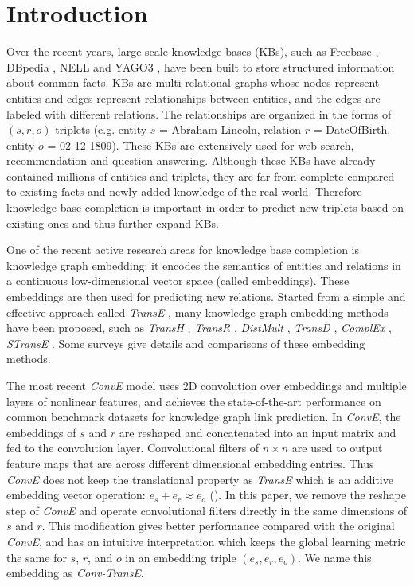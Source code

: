 \documentclass[letterpaper]{article} \usepackage{aaai19}  \usepackage{times}  \usepackage{helvet}  \usepackage{courier}  \usepackage{url}  \usepackage{graphicx}  \usepackage{amsmath}
\begin{document}
\section{Introduction}
\noindent

Over the recent years, large-scale knowledge bases (KBs), such as Freebase \cite{bollacker2008freebase}, DBpedia \cite{auer2007dbpedia}, NELL \cite{carlson2010toward} and YAGO3 \cite{mahdisoltani2013yago3}, have been built to store structured information about common facts. KBs are multi-relational graphs whose nodes represent entities and edges represent relationships between entities, and the edges are labeled with different relations. The relationships are organized in the forms of $(s,r,o)$ triplets (e.g. entity $s$ = Abraham Lincoln, relation $r$ = DateOfBirth, entity $o$ = 02-12-1809). These KBs are extensively used for web search, recommendation and question answering. Although these KBs have already contained millions of entities and triplets, they are far from complete compared to existing facts and newly added knowledge of the real world. Therefore knowledge base completion is important in order to predict new triplets based on existing ones and thus further expand KBs.

One of the recent active research areas for knowledge base completion is knowledge graph embedding: it encodes the semantics of entities and relations in a continuous low-dimensional vector space (called embeddings). These embeddings are then used for predicting new relations. Started from a simple and effective approach called
{\it TransE} \cite{bordes2013translating}, many knowledge graph embedding methods have been proposed, such as {\it TransH} \cite{wang2014knowledge}, {\it TransR} \cite{lin2015learning}, {\it DistMult} \cite{yang2014distmult}, {\it TransD} \cite{ji2015knowledge}, {\it ComplEx} \cite{trouillon2016complex}, {\it STransE} \cite{nguyen2016stranse}. Some surveys \cite{nguyen2017overview,wang2017knowledge} give details and comparisons of these embedding methods.

The most recent {\it ConvE} \cite{dettmers2017conve} model uses 2D convolution over embeddings and multiple layers of nonlinear features, and achieves the state-of-the-art performance on common benchmark datasets for knowledge graph link prediction. In {\it ConvE}, the embeddings of $s$ and $r$ are reshaped and concatenated into an input matrix and fed to the convolution layer. Convolutional filters of $n \times n$  are used to output feature maps that are across different dimensional embedding entries. Thus {\it ConvE} does not keep the translational property as {\it TransE} which is an additive embedding vector operation: $e_{s} + e_{r} \approx e_{o}$ (\cite{nguyen2017novel}). In this paper, we remove the reshape step of {\it ConvE} and operate convolutional filters directly in the same dimensions of $s$ and $r$. This modification gives better performance compared with the original {\it ConvE}, and has an intuitive interpretation which keeps the global learning metric the same for $s$, $r$, and $o$ in an embedding triple $(e_{s},e_{r},e_{o})$. We name this embedding as {\it Conv-TransE}.
\end{document}
